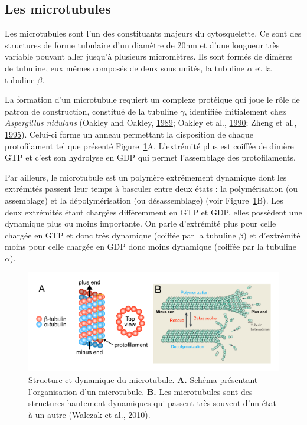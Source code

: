 \documentclass[12pt,a4paper,twoside,openright]{book}
\begin{document}
\subsection{Les microtubules}\label{les-microtubules}

Les microtubules sont l'un des constituants majeurs du cytosquelette. Ce
sont des structures de forme tubulaire d'un diamètre de 20nm et d'une
longueur très variable pouvant aller jusqu'à plusieurs micromètres. Ils
sont formés de dimères de tubuline, eux mêmes composés de deux sous
unités, la tubuline \(\alpha\) et la tubuline \(\beta\).

La formation d'un microtubule requiert un complexe protéique qui joue le
rôle de patron de construction, constitué de la tubuline \(\gamma\),
identifiée initialement chez \emph{Aspergillus nidulans} (Oakley and
Oakley, \protect\hyperlink{ref-Oakley1989}{1989}; Oakley et al.,
\protect\hyperlink{ref-Oakley1990}{1990}; Zheng et al.,
\protect\hyperlink{ref-Zheng1995}{1995}). Celui-ci forme un anneau
permettant la disposition de chaque protofilament tel que présenté
Figure~\ref{fig:mt}A. L'extrémité plus est coiffée de dimère GTP et
c'est son hydrolyse en GDP qui permet l'assemblage des protofilaments.

Par ailleurs, le microtubule est un polymère extrêmement dynamique dont
les extrémités passent leur temps à basculer entre deux états : la
polymérisation (ou assemblage) et la dépolymérisation (ou désassemblage)
(voir Figure~\ref{fig:mt}B). Les deux extrémités étant chargées
différemment en GTP et GDP, elles possèdent une dynamique plus ou moins
importante. On parle d'extrémité plus pour celle chargée en GTP et donc
très dynamique (coiffée par la tubuline \(\beta\)) et d'extrémité moins
pour celle chargée en GDP donc moins dynamique (coiffée par la tubuline
\(\alpha\)).

\begin{figure}[htbp]
\centering
\includegraphics{figures/intro/mt.png}
\caption[Structure et dynamique du microtubule]{\label{fig:mt}Structure
et dynamique du microtubule. \textbf{A.} Schéma présentant
l'organisation d'un microtubule. \textbf{B.} Les microtubules sont des
structures hautement dynamiques qui passent très souvent d'un état à un
autre (Walczak et al., \protect\hyperlink{ref-Walczak2010}{2010}).}
\end{figure}
\end{document}
